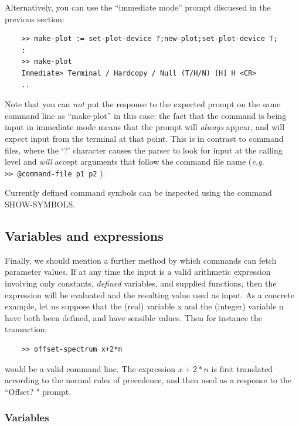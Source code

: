 \documentclass[11pt,twoside]{report}
\newcommand{\eg}{{\it e.g.\,}}
\begin{document}
Alternatively, you can use the ``immediate mode'' prompt discussed in the
previous section:
\begin{verbatim}
    >> make-plot := set-plot-device ?;new-plot;set-plot-device T;
    :
    >> make-plot
    Immediate> Terminal / Hardcopy / Null (T/H/N) [H] H <CR>
    ..
\end{verbatim}
Note that you can {\em not} put the response to the expected prompt on the
same command line as ``make-plot'' in this case: the fact that the command
is being input in immediate mode means that the prompt will {\em always}
appear, and will expect input from the terminal at that point. This is in
contrast to command files, where the `?' character causes the parser to
look for input at the calling level and {\em will} accept arguments that
follow the command file name (\eg \\ \verb+>> @command-file p1 p2+ ).

Currently defined command symbols can be inspected using the command
SHOW-SYMBOLS.


\subsection{Variables and expressions}

Finally, we should mention a further method by which commands can fetch
parameter values. If at any time the input is a valid arithmetic
expression involving only constants, {\em
defined} variables, and supplied functions, then the expression will be
evaluated and the resulting value used as input. As a concrete example, let us
suppose that the (real) variable x and the (integer) variable n have both been
defined, and have sensible values. Then for instance the transaction:
\begin{verbatim}
    >> offset-spectrum x+2*n
\end{verbatim}
would be a valid command line. The expression $x+2*n$ is first translated
according to the normal rules of precedence, and
then used as a response to the ``Offset? " prompt.

\subsubsection{Variables}
\end{document}
